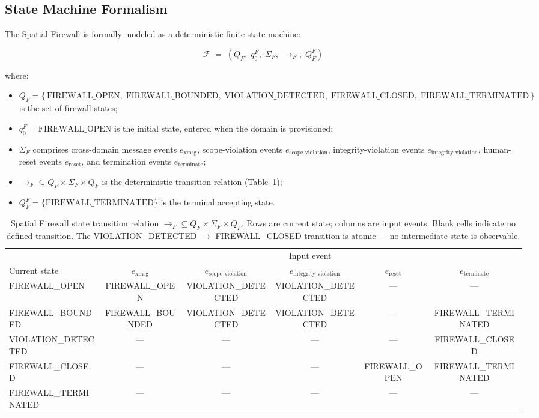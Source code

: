 \subsection{State Machine Formalism}\label{sec:firewall-state-machine}

The Spatial Firewall is formally modeled as a deterministic finite state machine:

\[
\mathcal{F} \;=\; (Q_F,\; q_0^F,\; \Sigma_F,\; \rightarrow_F,\; Q_F^F)
\]

where:

\begin{itemize}\itemsep=0pt
\item $Q_F = \{\,\text{FIREWALL\_OPEN},\; \text{FIREWALL\_BOUNDED},\; \text{VIOLATION\_DETECTED},\; \text{FIREWALL\_CLOSED},\; \text{FIREWALL\_TERMINATED}\,\}$ is the set of firewall states;
\item $q_0^F = \text{FIREWALL\_OPEN}$ is the initial state, entered when the domain is provisioned;
\item $\Sigma_F$ comprises cross-domain message events $e_{\text{xmsg}}$, scope-violation events $e_{\text{scope-violation}}$, integrity-violation events $e_{\text{integrity-violation}}$, human-reset events $e_{\text{reset}}$, and termination events $e_{\text{terminate}}$;
\item $\rightarrow_F \subseteq Q_F \times \Sigma_F \times Q_F$ is the deterministic transition relation (Table~\ref{tab:firewall-transition});
\item $Q_F^F = \{\text{FIREWALL\_TERMINATED}\}$ is the terminal accepting state.
\end{itemize}

\begin{table}[htbp]
\caption{Spatial Firewall state transition relation $\rightarrow_F \subseteq Q_F \times \Sigma_F \times Q_F$. Rows are current state; columns are input events. Blank cells indicate no defined transition. The VIOLATION\_DETECTED $\rightarrow$ FIREWALL\_CLOSED transition is atomic — no intermediate state is observable.}
\label{tab:firewall-transition}
\begin{tabular}{@{}lccccc@{}}
\toprule
 & \multicolumn{5}{c}{Input event} \\
\cmidrule(l){2-6}
Current state & $e_{\text{xmsg}}$ & $e_{\text{scope-violation}}$ & $e_{\text{integrity-violation}}$ & $e_{\text{reset}}$ & $e_{\text{terminate}}$ \\
\midrule
FIREWALL\_OPEN & FIREWALL\_OPEN & VIOLATION\_DETECTED & VIOLATION\_DETECTED & — & — \\
FIREWALL\_BOUNDED & FIREWALL\_BOUNDED & VIOLATION\_DETECTED & VIOLATION\_DETECTED & — & FIREWALL\_TERMINATED \\
VIOLATION\_DETECTED & — & — & — & — & FIREWALL\_CLOSED \\
FIREWALL\_CLOSED & — & — & — & FIREWALL\_OPEN & FIREWALL\_TERMINATED \\
FIREWALL\_TERMINATED & — & — & — & — & — \\
\bottomrule
\end{tabular}
\end{table}

